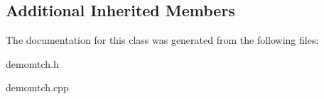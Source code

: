 \subsection*{Additional Inherited Members}


The documentation for this class was generated from the following files\-:\begin{DoxyCompactItemize}
\item 
demomtch.\-h\item 
demomtch.\-cpp\end{DoxyCompactItemize}
